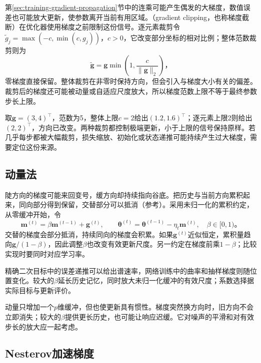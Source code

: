 第\ref{sec:training-gradient-propagation}节中的连乘可能产生偶发的大梯度，数值误差也可能放大更新，使参数离开当前有用区域。（gradient clipping，也称梯度截断）在优化器使用梯度之前限制这份信号。逐元素裁剪令$\tilde g_j=\max(-c,\min(c,g_j))$，$c>0$，它改变部分坐标的相对比例；整体范数裁剪则为
\begin{equation}
  \tilde{\bm g}=\bm g\min\left(1,\frac{c}{\lVert\bm g\rVert_2}\right)\text{，}
  \label{eq:training-norm-clipping}
\end{equation}
零梯度直接保留。整体裁剪在非零时保持方向，但会引入与梯度大小有关的偏差。裁剪后的梯度还可能被动量或自适应尺度放大，所以梯度范数上限不等于最终参数步长上限。

取$\bm g=(3,4)^{\top}$，范数为5，整体上限$c=2$给出$(1.2,1.6)^{\top}$；逐元素上限2则给出$(2,2)^{\top}$，方向已改变。两种裁剪都控制极端更新，小于上限的信号保持原样。若几乎每步都被大幅裁剪，损失缩放、初始化或状态递推可能持续产生过大梯度，需要定位这份来源。

\subsection{动量法}
\label{sec:training-momentum}

陡方向的梯度可能来回变号，缓方向却持续指向谷底。把历史与当前方向累积起来，同向部分得到保留，交替部分可以抵消（参考）。采用未归一化的累积约定，从零缓冲开始，令
\begin{equation}
  \bm m^{(t)}=\beta\bm m^{(t-1)}+\bm g^{(t)},\qquad
  \bm\theta^{(t)}=\bm\theta^{(t-1)}-\eta_t\bm m^{(t)},
  \quad\beta\in[0,1)\text{。}
  \label{eq:training-momentum}
\end{equation}
交替的梯度会部分抵消，持续同向的梯度会积累。如果$\bm g^{(t)}$近似恒定，累积量趋向$\bm g/(1-\beta)$，因此调整$\beta$也改变有效更新尺度。另一约定在梯度前乘$1-\beta$；比较实现时要同时对应学习率。

精确二次目标中的误差递推可以给出谱速率，网络训练中的曲率和抽样梯度则随位置变化。较大的$\beta$延长历史记忆，同时放大未归一化缓冲的有效尺度；系数选择据实际目标与更新评价。

动量只增加一个$p$维缓冲，但也使更新具有惯性。梯度突然换方向时，旧方向不会立即消失；较大的$\beta$提供更长历史，也可能让响应迟缓。它对噪声的平滑和对有效步长的放大应一起考虑。

\subsection{Nesterov加速梯度}
\label{sec:training-nesterov}

